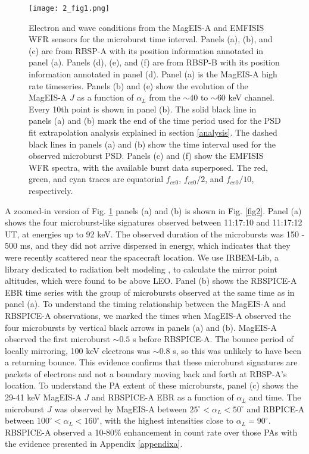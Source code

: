 \begin{figure}
\centering
\texttt{[image: 2\_fig1.png]}
\caption{Electron and wave conditions from the MagEIS-A and EMFISIS WFR sensors for the microburst time interval. Panels (a), (b), and (c) are from RBSP-A with its position information annotated in panel (a). Panels (d), (e), and (f) are from RBSP-B with its position information annotated in panel (d). Panel (a) is the MagEIS-A high rate timeseries. Panels (b) and (e) show the evolution of the MagEIS-A $J$ as a function of $\alpha_{L}$ from the ${\sim} 40$ to ${\sim} 60$ keV channel. Every 10th point is shown in panel (b). The solid black line in panels (a) and (b) mark the end of the time period used for the PSD fit extrapolation analysis explained in section \ref{analysis}. The dashed black lines in panels (a) and (b) show the time interval used for the observed microburst PSD. Panels (c) and (f) show the EMFISIS WFR spectra, with the available burst data superposed. The red, green, and cyan traces are equatorial $f_{ce0}$, $f_{ce0}/2$, and $f_{ce0}/10$, respectively. }
\label{fig1}
\end{figure}

A zoomed-in version of Fig. \ref{fig1} panels (a) and (b) is shown in Fig. \ref{fig2}. Panel (a) shows the four microburst-like signatures observed between 11:17:10 and 11:17:12 UT, at energies up to 92 keV. The observed duration of the microbursts was 150 - 500 ms, and they did not arrive dispersed in energy, which indicates that they were recently scattered near the spacecraft location. We use IRBEM-Lib, a library dedicated to radiation belt modeling \citep{irbem}, to calculate the mirror point altitudes, which were found to be above LEO. Panel (b) shows the RBSPICE-A EBR time series with the group of microbursts observed at the same time as in panel (a). To understand the timing relationship between the MagEIS-A and RBSPICE-A observations, we marked the times when MagEIS-A observed the four microbursts by vertical black arrows in panels (a) and (b). MagEIS-A observed the first microburst $\sim 0.5$ s before RBSPICE-A. The bounce period of locally mirroring, 100 keV electrons was $\sim 0.8$ s, so this was unlikely to have been a returning bounce. This evidence confirms that these microburst signatures are packets of electrons and not a boundary moving back and forth at RBSP-A's location. To understand the PA extent of these microbursts, panel (c) shows the 29-41 keV MagEIS-A $J$ and RBSPICE-A EBR as a function of $\alpha_{L}$ and time. The microburst $J$ was observed by MagEIS-A between $25^\circ < \alpha_L < 50^\circ$ and RBPICE-A between $100^\circ < \alpha_L < 160^\circ$, with the highest intensities close to $\alpha_L = 90^\circ$. RBSPICE-A observed a 10-80\% enhancement in count rate over those PAs with the evidence presented in Appendix \ref{appendixa}.

